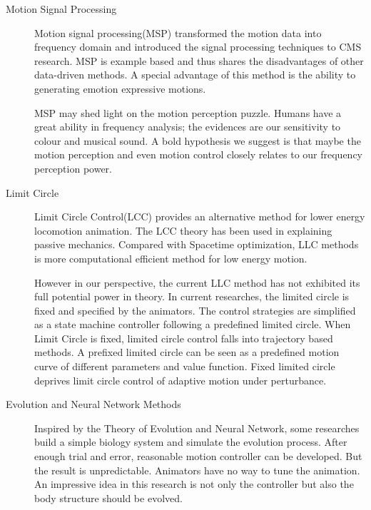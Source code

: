 \begin{description}
\item [Motion Signal Processing]
Motion signal processing(MSP)\citep{bruderlin1995motion} transformed the motion data into frequency domain and introduced the signal processing techniques to CMS research.
MSP is example based and thus shares the disadvantages of other data-driven methods.  
A special advantage of this method is the ability to generating emotion expressive motions. 

MSP may shed light on the motion perception puzzle. 
Humans have a great ability in frequency analysis; the evidences are our sensitivity to colour and musical sound. 
A bold hypothesis we suggest is that maybe the motion perception and even motion control closely relates to our frequency perception power.
\item [Limit Circle]
Limit Circle Control(LCC) \citep{Laszlo1996} provides an alternative method for lower energy locomotion animation. 
The LCC theory has been used in explaining passive mechanics.  
Compared with Spacetime optimization, LLC methods is more computational efficient method for low energy motion.

However in our perspective, the current LLC method has not exhibited its full potential power in theory. 
In current researches\citep{Coros2009,Laszlo1996}, the limited circle is fixed and specified by the animators. 
The control strategies are simplified as a state machine controller following a predefined limited circle.
When Limit Circle is fixed, limited circle control falls into trajectory based methods. 
A prefixed limited circle can be seen as a predefined motion curve of different parameters and value function. 
Fixed limited circle deprives limit circle control of adaptive motion under perturbance.

 
\item [Evolution and Neural Network Methods]
Inspired by the Theory of Evolution and Neural Network, some researches\citep{Sims} build a simple biology system and simulate the evolution process. 
After enough trial and error, reasonable motion controller can be developed. 
But the result is unpredictable. 
Animators have no way to tune the animation.
An impressive idea in this research is not only the controller but also the body structure should be evolved.
\end{description}


